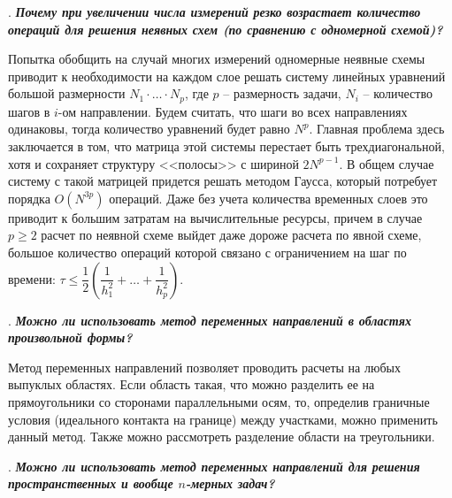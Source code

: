\documentclass[12pt, a4paper]{article}
\newcounter{mycounter}
\newcommand{\quastion}[1]{%
	\stepcounter{mycounter}%
	\textbf{\themycounter}.  %
	\textbf{\textit{#1}}
	
}
\begin{document}
	
	
	\quastion{Почему при увеличении числа измерений резко возрастает количество операций для решения неявных схем (по сравнению с одномерной схемой)?}
	
	Попытка обобщить на случай многих измерений одномерные неявные схемы приводит к необходимости на каждом слое решать систему линейных уравнений большой размерности $N_1 \cdot \ldots \cdot N_p$, где $p$ -- размерность задачи, $N_i$ -- количество шагов в $i$-ом направлении. Будем считать, что шаги во всех направлениях одинаковы, тогда количество уравнений будет равно $N^p$. Главная проблема здесь заключается в том, что матрица этой системы перестает быть трехдиагональной, хотя и сохраняет структуру <<полосы>> с шириной $2N^{p-1}$. В общем случае систему с такой матрицей придется решать методом Гаусса, который потребует порядка $O(N^{3p})$ операций. Даже без учета количества временных слоев это приводит к большим затратам на вычислительные ресурсы, причем в случае $p \geq 2$ расчет по неявной схеме выйдет даже дороже расчета по явной схеме, большое количество операций которой связано с ограничением на шаг по времени: $ \tau \leq \dfrac{1}{2} \left( \dfrac{1}{h_1^2} + \ldots + \dfrac{1}{h_p^2} \right).$
	
	

	\bigskip
	
	
	
	
	
	
	
	
	
	
	
	\quastion{Можно ли использовать метод переменных направлений в
	областях произвольной формы?}
	
	Метод переменных направлений позволяет проводить расчеты на любых выпуклых областях. Если область такая, что можно разделить ее на прямоугольники со сторонами параллельными осям, то, определив граничные условия (идеального контакта на границе) между участками, можно применить данный метод. Также можно рассмотреть разделение области на треугольники. 

	
	
	
	\bigskip
	
	
	\quastion{Можно ли использовать метод переменных направлений
	для решения пространственных и вообще $n$-мерных задач?}
	
	
\end{document}
